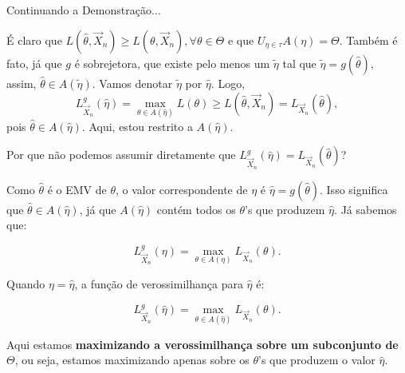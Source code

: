 \documentclass[12pt]{beamer}
\begin{document}
\begin{frame}{Continuando a Demonstração$\ldots$}
	\begin{block}{}
		\justifying
	É claro que $L(\hat{\theta},\vec{X}_{n})\geq L(\theta,\vec{X}_{n}), \forall \theta\in \Theta$ e que ${\displaystyle U_{\eta\in \tau}}A(\eta)=\Theta.$ Também é fato, já que $g$ é sobrejetora, que existe pelo menos um $\tilde{\eta}$ tal que $\tilde{\eta}=g(\hat{\theta}),$ assim, $\hat{\theta}\in A(\tilde{\eta}).$ Vamos denotar $\tilde{\eta}$ por $\hat{\eta}.$ Logo, $$L_{\vec{X}_{n}}^{g}(\hat{\eta})=\max_{\theta\in A(\hat{\eta})}L(\theta)\geq L(\hat{\theta},\vec{X}_{n})=L_{\vec{X}_{n}}(\hat{\theta}),$$ pois $\hat{\theta}\in A(\hat{\eta}).$ Aqui, estou restrito a $A(\hat{\eta}).$
	\end{block}
\end{frame}

\begin{frame}{Por que não podemos assumir diretamente que \( L_{\vec{X}_n}^{g}(\hat{\eta}) = L_{\vec{X}_n}(\hat{\theta}) \)?}
	\begin{block}{}
		\justifying
		Como \( \hat{\theta} \) é o EMV de \( \theta \), o valor correspondente de \( \eta \) é \( \hat{\eta} = g(\hat{\theta}) \). Isso significa que \( \hat{\theta} \in A(\hat{\eta}) \), já que \( A(\hat{\eta}) \) contém todos os \( \theta \)'s que produzem \( \hat{\eta} \). Já sabemos que:
		
		\[
		L_{\vec{X}_n}^{g}(\eta) = \max_{\theta \in A(\eta)} L_{\vec{X}_n}(\theta).
		\]
		
		Quando \( \eta = \hat{\eta} \), a função de verossimilhança para \( \hat{\eta} \) é:
		
		\[
		L_{\vec{X}_n}^{g}(\hat{\eta}) = \max_{\theta \in A(\hat{\eta})} L_{\vec{X}_n}(\theta).
		\]
		
		Aqui estamos \textbf{maximizando a verossimilhança sobre um subconjunto de \( \Theta \)}, ou seja, estamos maximizando apenas sobre os \( \theta \)'s que produzem o valor \( \hat{\eta} \).
		
	\end{block}
\end{frame}
\end{document}
